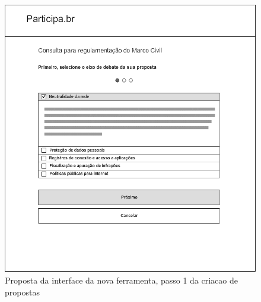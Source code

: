 \documentclass[12pt]{article}
\begin{document}
\begin{figure}[h]
\center
\includegraphics[scale=0.5]{03_-_proposta_passo_1.png}
\caption{Proposta da interface da nova ferramenta, passo 1 da criacao de
propostas}
\label{fig:proposta03}
\end{figure}
\end{document}

